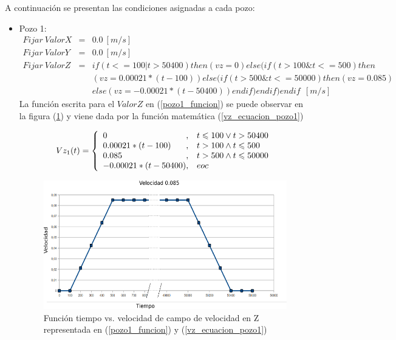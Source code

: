 \documentclass[10pt,a4paper,final]{article}
\begin{document}
A continuación se presentan las condiciones asignadas a cada pozo:
\begin{itemize}
\item Pozo 1: 
\begin{eqnarray} \label{pozo1_funcion}
\nonumber
Fijar~ValorX&=&0.0~[m/s]\\
\nonumber
Fijar~ValorY&=&0.0~[m/s]\\
Fijar~ValorZ&=& if(t<=100 | t>50400)then(vz=0)else(if(t>100 \& t<=500)then\\
\nonumber
&&(vz=0.00021*(t-100))else(if(t>500 \& t<=50000)then(vz=0.085)\\&&
\nonumber
else(vz=-0.00021*(t-50400))endif)endif)endif~~[m/s]
\end{eqnarray}
La función escrita para el $ValorZ$ en (\ref{pozo1_funcion}) se puede observar en la figura (\ref{grafica1_0085}) y viene dada por la función matemática (\ref{vz_ecuacion_pozo1})

%
\begin{equation}\label{vz_ecuacion_pozo1}
Vz_1(t) = \left\{
\begin{array}{l@{,\quad}l}
0 & t\leqslant 100 \vee t > 50400 \\
0.00021*(t-100) & t > 100 \wedge t\leqslant 500 \\
0.085 & t > 500 \wedge t\leqslant 50000 \\
-0.00021*(t-50400) & eoc
\end{array}
\right.
\end{equation}
%

\begin{figure}[tbhp]
\centerline{\includegraphics[scale=0.6]{graficas/0085}}
\caption{Función tiempo vs. velocidad de campo de velocidad en Z representada en (\ref{pozo1_funcion}) y (\ref{vz_ecuacion_pozo1})}
\label{grafica1_0085}
\end{figure}


\end{itemize}
\end{document}
